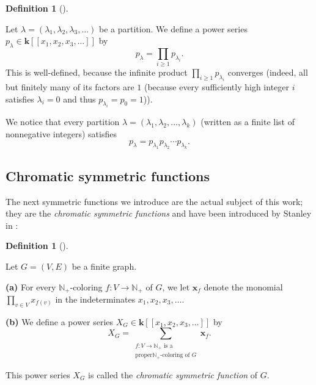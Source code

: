 \documentclass[numbers=enddot,12pt,final,onecolumn,notitlepage]{scrartcl}%
\theoremstyle{definition}
\newtheorem{defi}[theo]{Definition}
\newenvironment{definition}[1][]
{\begin{defi}[#1]\begin{leftbar}}
{\end{leftbar}\end{defi}}
\let\sumnonlimits\sum
\let\prodnonlimits\prod
\renewcommand{\sum}{\sumnonlimits\limits}
\renewcommand{\prod}{\prodnonlimits\limits}
\begin{document}
\begin{definition}
\label{def.powersum2}Let $\lambda=\left(  \lambda_{1},\lambda_{2},\lambda
_{3},\ldots\right)  $ be a partition. We define a power series $p_{\lambda}%
\in\mathbf{k}\left[  \left[  x_{1},x_{2},x_{3},\ldots\right]  \right]  $ by%
\[
p_{\lambda}=\prod_{i\geq1}p_{\lambda_{i}}.
\]
This is well-defined, because the infinite product $\prod_{i\geq1}%
p_{\lambda_{i}}$ converges (indeed, all but finitely many of its factors are
$1$ (because every sufficiently high integer $i$ satisfies $\lambda_{i}=0$ and
thus $p_{\lambda_{i}}=p_{0}=1$)).
\end{definition}

We notice that every partition $\lambda=\left(  \lambda_{1},\lambda_{2}%
,\ldots,\lambda_{k}\right)  $ (written as a finite list of nonnegative
integers) satisfies%
\begin{equation}
p_{\lambda}=p_{\lambda_{1}}p_{\lambda_{2}}\cdots p_{\lambda_{k}}.
\label{eq.def.powersum2.finite-expression}%
\end{equation}


\subsection{Chromatic symmetric functions}

The next symmetric functions we introduce are the actual subject of this work;
they are the \emph{chromatic symmetric functions} and have been introduced by
Stanley in \cite[Definition 2.1]{Stanley-chsym}:

\Needspace{4cm}

\begin{definition}
\label{def.chromsym}Let $G=\left(  V,E\right)  $ be a finite graph.

\textbf{(a)} For every $\mathbb{N}_{+}$-coloring $f:V\rightarrow\mathbb{N}%
_{+}$ of $G$, we let $\mathbf{x}_{f}$ denote the monomial $\prod_{v\in
V}x_{f\left(  v\right)  }$ in the indeterminates $x_{1},x_{2},x_{3},\ldots$.

\textbf{(b)} We define a power series $X_{G}\in\mathbf{k}\left[  \left[
x_{1},x_{2},x_{3},\ldots\right]  \right]  $ by%
\[
X_{G}=\sum_{\substack{f:V\rightarrow\mathbb{N}_{+}\text{ is a}\\\text{proper
}\mathbb{N}_{+}\text{-coloring of }G}}\mathbf{x}_{f}.
\]


This power series $X_{G}$ is called the \emph{chromatic symmetric function} of
$G$.
\end{definition}
\end{document}
